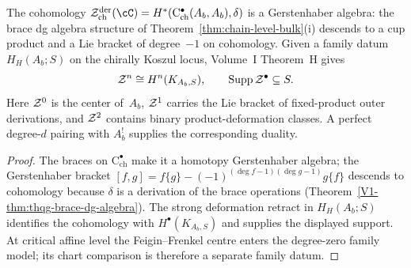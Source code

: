 \begin{corollary}
\label{cor:gerstenhaber-on-cohomology}
The cohomology\/
$\cZ^{\mathrm{der}}_{\mathrm{ch}}(\cC)
= H^*(\mathrm{C}^\bullet_{\mathrm{ch}}(A_b, A_b), \delta)$
is a Gerstenhaber algebra: the brace dg algebra structure of
Theorem~\textup{\ref{thm:chain-level-bulk}(i)} descends to a
cup product and a Lie bracket of degree~$-1$ on cohomology.
Given a family datum $H_H(A_b;S)$ on the chirally Koszul locus,
Volume~I Theorem~H gives
\[
 \mathcal{Z}^n\cong H^n(K_{A_b,S}),
 \qquad
 \operatorname{Supp}\mathcal{Z}^\bullet\subseteq S.
\]
Here $\mathcal{Z}^0$ is the center of~$A_b$, $\mathcal{Z}^1$ carries the Lie
bracket of fixed-product outer derivations, and $\mathcal{Z}^2$ contains
binary product-deformation classes.  A perfect degree-$d$ pairing
with $A_b^!$ supplies the corresponding duality.
\end{corollary}

\begin{proof}
The braces on $\mathrm{C}^\bullet_{\mathrm{ch}}$ make it a
homotopy Gerstenhaber algebra; the Gerstenhaber bracket
$[f,g] = f\{g\} - (-1)^{(\deg f - 1)(\deg g - 1)} g\{f\}$
descends to cohomology because $\delta$ is a derivation of the
brace operations
(Theorem~\ref*{V1-thm:thqg-brace-dg-algebra}).
The strong deformation retract in $H_H(A_b;S)$ identifies the
cohomology with $H^\bullet(K_{A_b,S})$ and supplies the displayed
support.  At critical affine level the Feigin--Frenkel centre enters
the degree-zero family model; its chart comparison is therefore a
separate family datum.
\end{proof}

